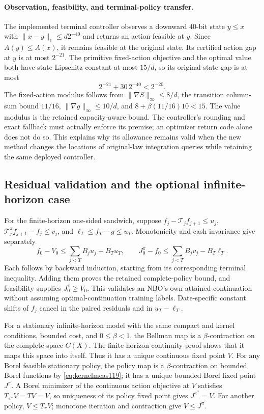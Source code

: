 \paragraph{Observation, feasibility, and terminal-policy transfer.}
The implemented terminal controller observes a downward $40$-bit state
$y\le x$ with $\|x-y\|_1\le d2^{-40}$ and returns an action
feasible at $y$.  Since $A(y)\le A(x)$, it remains feasible at
the original state.  Its certified action gap at $y$ is at most
$2^{-21}$.  The primitive fixed-action objective and the optimal
value both have state Lipschitz constant at most $15/d$, so its
original-state gap is at most
\[
 2^{-21}+30\,2^{-40}<2^{-20}.
\]
The fixed-action modulus follows from
$\|\nabla S\|_\infty\le8/d$, the transition column-sum bound
$11/16$, $\|\nabla g\|_\infty\le10/d$, and
$8+\beta(11/16)10<15$.  The value modulus is the retained
capacity-aware bound.  The controller's rounding and exact fallback
must actually enforce its premise; an optimizer return code alone
does not do so.  This explains why its allowance remains valid when
the new method changes the locations of original-law integration
queries while retaining the same deployed controller.

\subsection{Residual validation and the optional infinite-horizon case}
For the finite-horizon one-sided sandwich, suppose
$f_j-\mathcal T_jf_{j+1}\le u_j$,
$\mathcal T_j^\pi f_{j+1}-f_j\le v_j$, and
$\ell_T\le f_T-g\le u_T$.  Monotonicity and cash invariance
give separately
\[
 f_0-V_0\le\sum_{j<T}B_ju_j+B_Tu_T,
 \qquad
 J_0^\pi-f_0\le\sum_{j<T}B_jv_j-B_T\ell_T.
\]
Each follows by backward induction, starting from its corresponding
terminal inequality.  Adding them proves the retained complete-policy
bound, and feasibility supplies $J_0^\pi\ge V_0$.  This validates
an NBO's own attained continuation without assuming optimal-continuation
training labels.  Date-specific constant shifts of $f_j$ cancel in
the paired residuals and in $u_T-\ell_T$.

For a stationary infinite-horizon model with the same compact and
kernel conditions, bounded cost, and $0\le\beta<1$, the Bellman
map is a $\beta$-contraction on the complete space $C(X)$.
The finite-horizon continuity proof shows that it maps this space
into itself.  Thus it has a unique continuous fixed point $V$.
For any Borel feasible stationary policy, the policy map is a
$\beta$-contraction on bounded Borel functions by
\eqref{eq:kernelmeas119}; it has a unique bounded Borel fixed
point $J^\pi$.  A Borel minimizer of the continuous action
objective at $V$ satisfies $T_{\pi^*}V=TV=V$, so uniqueness
of its policy fixed point gives $J^{\pi^*}=V$.
For another policy, $V\le T_\pi V$; monotone iteration and
contraction give $V\le J^\pi$.

